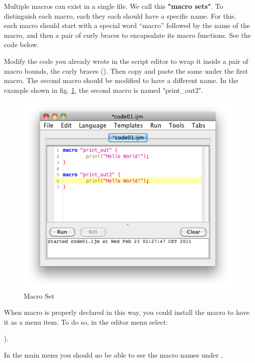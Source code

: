 \begin{indentexercise}{3}
\item Multiple macros can exist in a single file. We call this \textbf{"macro sets"}. To distinguish each macro, each they each should have a specific name. For this, each macro should start with a special word ``macro'' followed by the name of the macro, and then a pair of curly braces to encapsulate its macro functions. See the code below.  



Modify the code you already wrote in the script editor to wrap it inside a pair of macro bounds, the curly braces (\ilcom{\{\}}).  Then copy and paste the same under the first macro. 
The second macro should be modified to have a different name. In the example shown in fig.
\ref{fig_MacroSetInMenu}, the second macro is named "print\_out2".
\begin{figure}[htbp]
\begin{center}
\includegraphics[scale=0.6]{fig/editor_MacroSet.png}
\caption{Macro Set} \label{fig_MacroSetInMenu}
\end{center}
\end{figure}
When macro is properly declared in this way, you could install the macro to have it as a menu item. To do so, in the editor menu select: 
\begin{indentFiji}
).
\end{indentFiji}
In the main menu you should no be able to see the macro names under .


\end{indentexercise}
